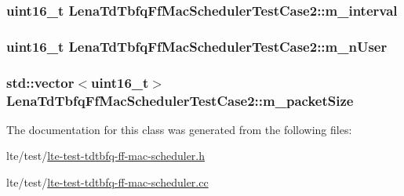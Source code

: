 \subsubsection[{\texorpdfstring{m\+\_\+interval}{m_interval}}]{\setlength{\rightskip}{0pt plus 5cm}uint16\+\_\+t Lena\+Td\+Tbfq\+Ff\+Mac\+Scheduler\+Test\+Case2\+::m\+\_\+interval\hspace{0.3cm}{\ttfamily [private]}}\hypertarget{classLenaTdTbfqFfMacSchedulerTestCase2_a4c505e022817f9759194c657d194414d}{}\label{classLenaTdTbfqFfMacSchedulerTestCase2_a4c505e022817f9759194c657d194414d}
\subsubsection[{\texorpdfstring{m\+\_\+n\+User}{m_nUser}}]{\setlength{\rightskip}{0pt plus 5cm}uint16\+\_\+t Lena\+Td\+Tbfq\+Ff\+Mac\+Scheduler\+Test\+Case2\+::m\+\_\+n\+User\hspace{0.3cm}{\ttfamily [private]}}\hypertarget{classLenaTdTbfqFfMacSchedulerTestCase2_a6c234ef9d9e91fe6aa53403eb32db14c}{}\label{classLenaTdTbfqFfMacSchedulerTestCase2_a6c234ef9d9e91fe6aa53403eb32db14c}
\subsubsection[{\texorpdfstring{m\+\_\+packet\+Size}{m_packetSize}}]{\setlength{\rightskip}{0pt plus 5cm}std\+::vector$<$uint16\+\_\+t$>$ Lena\+Td\+Tbfq\+Ff\+Mac\+Scheduler\+Test\+Case2\+::m\+\_\+packet\+Size\hspace{0.3cm}{\ttfamily [private]}}\hypertarget{classLenaTdTbfqFfMacSchedulerTestCase2_a1d0fb560aff325ef9ba8635e39ce3721}{}\label{classLenaTdTbfqFfMacSchedulerTestCase2_a1d0fb560aff325ef9ba8635e39ce3721}


The documentation for this class was generated from the following files\+:\begin{DoxyCompactItemize}
\item 
lte/test/\hyperlink{lte-test-tdtbfq-ff-mac-scheduler_8h}{lte-\/test-\/tdtbfq-\/ff-\/mac-\/scheduler.\+h}\item 
lte/test/\hyperlink{lte-test-tdtbfq-ff-mac-scheduler_8cc}{lte-\/test-\/tdtbfq-\/ff-\/mac-\/scheduler.\+cc}\end{DoxyCompactItemize}
